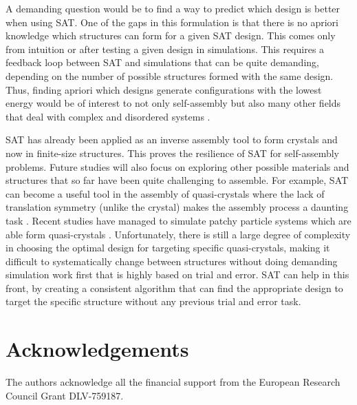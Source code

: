 \documentclass[a4paper, amsfonts, amssymb, amsmath, reprint, showkeys, nofootinbib, twoside]{revtex4-1}
\begin{document}
A demanding question would be to find a way to predict which design is better when using SAT. One of the gaps in this formulation is that there is no apriori knowledge which structures can form for a given SAT design. This comes only from intuition or after testing a given design in simulations. This requires a feedback loop between SAT and simulations that can be quite demanding, depending on the number of possible structures formed with the same design. Thus, finding apriori which designs generate configurations with the lowest energy would be of interest to not only self-assembly but also many other fields that deal with complex and disordered systems \cite{Franz2017}.

SAT has already been applied as an inverse assembly tool to form crystals and now in finite-size structures. This proves the resilience of SAT for self-assembly problems. Future studies will also focus on exploring other possible materials and structures that so far have been quite challenging to assemble. For example, SAT can become a useful tool in the assembly of quasi-crystals where the lack of translation symmetry (unlike the crystal) makes the assembly process a daunting task \cite{Shechtman1984}. Recent studies have managed to simulate patchy particle systems which are able form quasi-crystals \cite{Noya2021}. Unfortunately, there is still a large degree of complexity in choosing the optimal design for targeting specific quasi-crystals, making it difficult to systematically change between structures without doing demanding simulation work first that is highly based on trial and error. SAT can help in this front, by creating a consistent algorithm that can find the appropriate design to target the specific structure without any previous trial and error task.

\section{Acknowledgements}

The authors acknowledge all the financial support from the European Research Council Grant DLV-759187.


\end{document}
